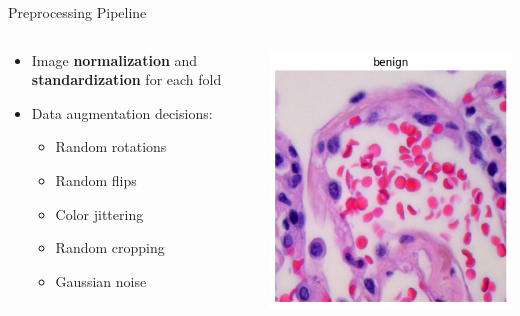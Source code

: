 \documentclass[aspectratio=169,8pt]{beamer}  %
\begin{document}
\begin{frame}{Preprocessing Pipeline}
\begin{columns}[T]
\begin{column}{0.5\textwidth}
\begin{itemize}
\item Image \textbf{normalization} and \textbf{standardization} for each fold
\item Data augmentation decisions:
  \begin{itemize}
  \item Random rotations
  \item Random flips
  \item Color jittering
  \item Random cropping
  \item Gaussian noise
  \end{itemize}
\end{itemize}
\end{column}
\begin{column}{0.5\textwidth}
\hfill\includegraphics[width=0.95\linewidth, height=0.45\textheight]{imgs/normal_image.png}
\vspace{0.2cm}

\end{column}
\end{columns}
\end{frame}
\end{document}

